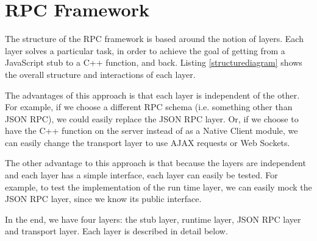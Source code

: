\section{RPC Framework} %
\label{sec:rpc_framework_structure}

The structure of the RPC framework is based around the notion of layers. 
Each layer solves a particular task, in order to achieve the goal of getting from a JavaScript stub to a C++ function, and back. Listing \ref{structurediagram} shows the overall structure and interactions of each layer.

The advantages of this approach is that each layer is independent of the other. For example, if we choose a different RPC schema (i.e. something other than JSON RPC), we could easily replace the JSON RPC layer. Or, if we choose to have the C++ function on the server instead of as a Native Client module, we can easily change the transport layer to use AJAX requests or Web Sockets. 


The other advantage to this approach is that because the layers are independent and each layer has a simple interface, each layer can easily be tested. For example, to test the implementation of the run time layer, we can easily mock the JSON RPC layer, since we know its public interface.

In the end, we have four layers: the stub layer, runtime layer, JSON RPC layer and transport layer. Each layer is described in detail below.

